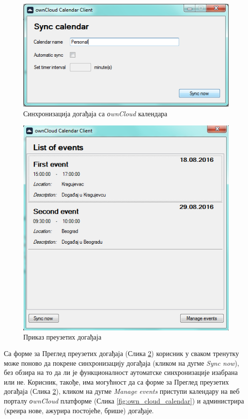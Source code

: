 \begin{figure}[H]
	\centering
	\includegraphics[scale=0.5]{slike/SyncCalendarPersonal.png}
	\caption{Синхронизација догађаја са \textit{оwnCloud} календара}
	\label{fig:sync_calendar_personal}
\end{figure}

\begin{figure}[H]
	\centering
	\includegraphics[scale=0.5]{slike/EventsList}
	\caption{Приказ преузетих догађаја}
	\label{fig:events_list}
\end{figure}

Са форме за Преглед преузетих догађаја (Слика \ref{fig:events_list}) корисник у сваком тренутку може поново да покрене синхронизацију догађаја (кликом на дугме \textit{Sync now}), без обзира на то да ли је функционалност аутоматске синхронизације изабрана или не. Корисник, такође, има могућност да са форме за Преглед преузетих догађаја  (Слика \ref{fig:events_list}), кликом на дугме \textit{Manage events} приступи календару на веб порталу \textit{оwnCloud} платформе (Слика \ref{fig:own_cloud_calendar})  и администрира (креира нове, ажурира постојеће, брише) догађаје.

